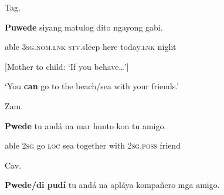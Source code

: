 \begin{listWWNumiileveli}
\item 
\begin{listWWNumiilevelii}
\item 
\begin{stylelsLanginfo}
Tag.
\end{stylelsLanginfo}
\end{listWWNumiilevelii}
\end{listWWNumiileveli}
\begin{stylelsSourceline}
\textbf{Puwede }siyang matulog dito ngayong gabi.
\end{stylelsSourceline}

\begin{stylelsIMT}
able 3\textsc{sg.nom.lnk}\textit{ }\textsc{stv}.sleep here today.\textsc{lnk}\textit{ }night
\end{stylelsIMT}

\begin{listWWNumiileveli}
\item 
\begin{stylelsLanginfo}
\label{bkm:Ref52741551}[Mother to child: ‘If you behave…’] 
\end{stylelsLanginfo}
\end{listWWNumiileveli}
\begin{stylelsLanginfo}
‘You \textbf{can} go to the beach/sea with your friends.’
\end{stylelsLanginfo}

\begin{listWWNumiileveli}
\item 
\begin{listWWNumiilevelii}
\item 
\begin{stylelsLanginfo}
Zam.
\end{stylelsLanginfo}
\end{listWWNumiilevelii}
\end{listWWNumiileveli}
\begin{stylelsSourceline}
\textbf{Pwede} tu andá na mar hunto kon tu amigo.
\end{stylelsSourceline}

\begin{stylelsIMT}
able 2\textsc{sg} go \textsc{loc} sea together with 2\textsc{sg}.\textsc{poss} friend
\end{stylelsIMT}

\begin{listWWNumiileveli}
\item 
\begin{listWWNumiilevelii}
\item 
\begin{stylelsLanginfo}
Cav.
\end{stylelsLanginfo}
\end{listWWNumiilevelii}
\end{listWWNumiileveli}
\begin{stylelsSourceline}
\textbf{Pwede/di pud\'{i}} tu andá na apláya kompañero mga amigo.
\end{stylelsSourceline}

